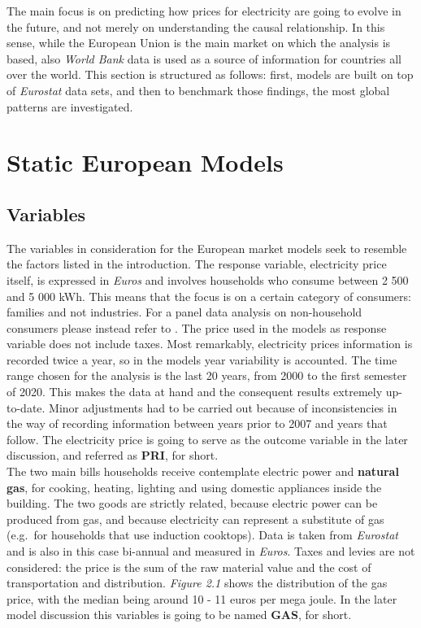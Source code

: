 \documentclass{book}
\begin{document}
The main focus is on predicting how prices for electricity are going to evolve in the future, and not merely on understanding the causal relationship. In this sense, while the European Union is the main market on which the analysis is based, also \textit{World Bank} data is used as a source of information for countries all over the world. This section is structured as follows: first, models are built on top of \textit{Eurostat} data sets, and then to benchmark those findings, the most global patterns are investigated.

\section{Static European Models}
\subsection{Variables}

The variables in consideration for the European market models seek to resemble the factors listed in the introduction. The response variable, electricity price itself, is expressed in \textit{Euros} and involves households who consume between 2 500 and 5 000 kWh. This means that the focus is on a certain category of consumers: families and not industries. For a panel data analysis on non-household consumers please instead refer to \cite{del2019industrial}.  The price used in the models as response variable does not include taxes. Most remarkably, electricity prices information is recorded twice a year, so in the models year variability is accounted. The time range chosen for the analysis is the last 20 years, from 2000 to the first semester of 2020. This makes the data at hand and the consequent results extremely up-to-date. Minor adjustments had to be carried out because of inconsistencies in the way of recording information between years prior to 2007 and years that follow. The electricity price is going to serve as the outcome variable in the later discussion, and referred as \textbf{PRI}, for short.\\

The two main bills households receive contemplate electric power and \textbf{natural gas}, for cooking, heating, lighting and using domestic appliances inside the building. The two goods are strictly related, because electric power can be produced from gas, and because electricity can represent a substitute of gas (e.g.\ for households that use induction cooktops). Data is taken from \textit{Eurostat} and is also in this case bi-annual and measured in \textit{Euros}. Taxes and levies are not considered: the price is the sum of the raw material value and the cost of transportation and distribution. \textit{Figure 2.1} shows the distribution of the gas price, with the median being around 10 - 11 euros per mega joule. In the later model discussion this variables is going to be named \textbf{GAS}, for short.
\end{document}
